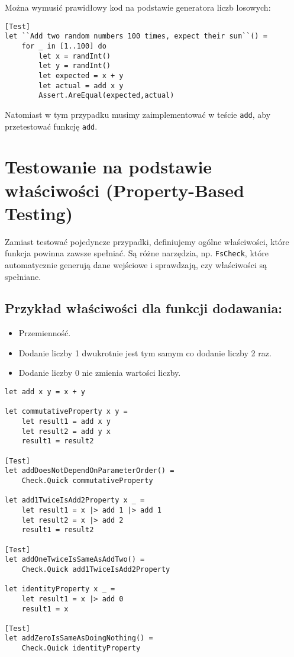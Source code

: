 Można wymusić prawidłowy kod na podstawie generatora liczb losowych:
\lstset{language=FSharp, basicstyle=\scriptsize}
\begin{lstlisting}[frame=single,caption={Przykładowe rozwiązanie},label=kod:listingA]
[Test]
let ``Add two random numbers 100 times, expect their sum``() =
    for _ in [1..100] do
        let x = randInt()
        let y = randInt()
        let expected = x + y
        let actual = add x y
        Assert.AreEqual(expected,actual)
\end{lstlisting}

Natomiast w tym przypadku musimy zaimplementować w teście \texttt{add}, aby przetestować funkcję \texttt{add}.

\section*{Testowanie na podstawie właściwości (Property-Based Testing)}

Zamiast testować pojedyncze przypadki, definiujemy ogólne właściwości, które funkcja powinna zawsze spełniać. Są różne narzędzia, np. \texttt{FsCheck}, które automatycznie generują dane wejściowe i sprawdzają, czy właściwości są spełniane.

\subsection*{Przykład właściwości dla funkcji dodawania:}
\begin{itemize}
    \item Przemienność.
    \item Dodanie liczby 1 dwukrotnie jest tym samym co dodanie liczby 2 raz.
    \item Dodanie liczby 0 nie zmienia wartości liczby.
\end{itemize}

\lstset{language=FSharp, basicstyle=\scriptsize}
\begin{lstlisting}[frame=single,caption={Testowanie na właściwościach},label=kod:listingA]
let add x y = x + y

let commutativeProperty x y =
    let result1 = add x y
    let result2 = add y x 
    result1 = result2

[Test]
let addDoesNotDependOnParameterOrder() =
    Check.Quick commutativeProperty

let add1TwiceIsAdd2Property x _ =
    let result1 = x |> add 1 |> add 1
    let result2 = x |> add 2
    result1 = result2

[Test]
let addOneTwiceIsSameAsAddTwo() =
    Check.Quick add1TwiceIsAdd2Property

let identityProperty x _ =
    let result1 = x |> add 0
    result1 = x

[Test]
let addZeroIsSameAsDoingNothing() =
    Check.Quick identityProperty
\end{lstlisting}

